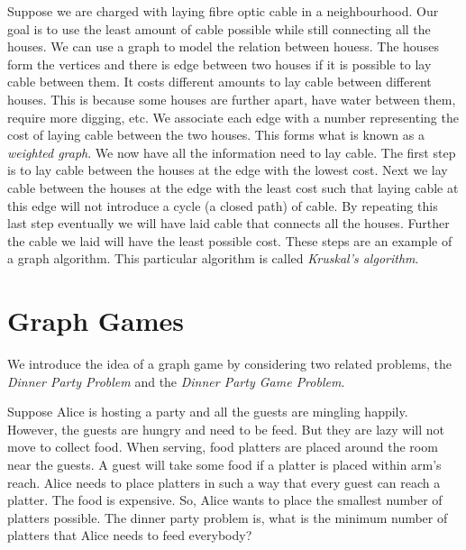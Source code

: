 Suppose we are charged with laying fibre optic cable in a neighbourhood. Our goal is to use the least amount of cable possible while still connecting all the houses. We can use a graph to model the relation between houess. The houses form the vertices and there is edge between two houses if it is possible to lay cable between them.
It costs different amounts to lay cable between different houses. This is because some houses are further apart, have water between them, require more digging, etc. 
We associate each edge with a number representing the cost of laying cable between the two houses. This forms what is known as a \textit{weighted graph}. We now have all the information need to lay cable. The first step is to lay cable between the houses at the edge with the lowest cost. Next we lay cable between the houses at the edge with the least cost such that laying cable at this edge will not introduce a cycle (a closed path) of cable. By repeating this last step eventually we will have laid cable that connects all the houses. Further the cable we laid will have the least possible cost. These steps are an example of a graph algorithm. This particular algorithm is called \textit{Kruskal's algorithm}. 
 
 \section{Graph Games}  
We introduce the idea of a graph game by considering two related problems, the \textit{Dinner Party Problem} and the \textit{Dinner Party Game Problem}.

Suppose Alice is hosting a party and all the guests are mingling happily. However, the guests are hungry and need to be feed. But they are lazy will not move to collect food. When serving, food platters are placed around the room near the guests. A guest will take some food if a platter is placed within arm's reach. Alice needs to place platters in such a way that every guest can reach a platter. The food is expensive. So, Alice wants to place the smallest number of platters possible. The dinner party problem is, what is the minimum number of platters that Alice needs to feed everybody? 



